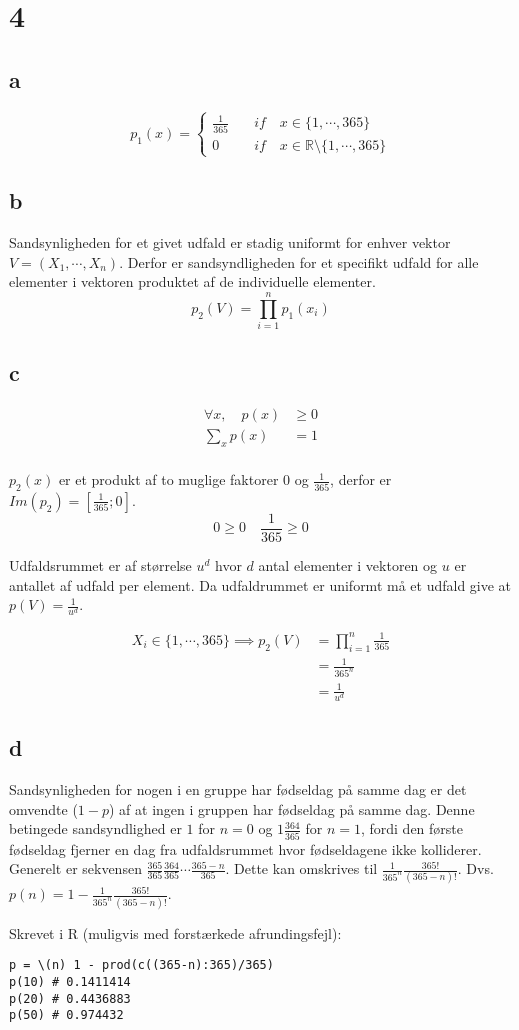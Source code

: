 \documentclass[11pt]{article}
\begin{document}
\section{4}
\label{sec:org962979d}
\subsection{a}
\label{sec:orgd035d0f}
\begin{equation}
p_1(x) =
\begin{cases}
\frac{1}{365} & \quad if \quad x \in \{1,\cdots,365\}\\
0 & \quad if \quad x \in \mathbb{R} \setminus \{1,\cdots,365\}
\end{cases}
\end{equation}
\subsection{b}
\label{sec:org9002a13}
Sandsynligheden for et givet udfald er stadig uniformt for enhver vektor \(V = (X_1,\cdots,X_n)\).
Derfor er sandsyndligheden for et specifikt udfald for alle elementer i vektoren produktet af de individuelle elementer.
\[
p_2(V) = \prod_{i=1}^n p_1(x_i)
\]
\subsection{c}
\label{sec:org89602e0}
\begin{align}
\forall x, \quad p(x) &\ge 0 \\
\sum_x p(x) &= 1 \\
\end{align}

\(p_2(x)\) er et produkt af to muglige faktorer \(0\) og \(\frac{1}{365}\),
derfor er \(Im(p_2) = [\frac{1}{365};0]\).
\[0 \ge 0 \quad \frac{1}{365} \ge 0\]

Udfaldsrummet er af størrelse \(u^d\) hvor \(d\) antal elementer i vektoren og \(u\) er antallet af udfald per element.
Da udfaldrummet er uniformt må et udfald give at \(p(V) = \frac{1}{u^d}\).

\begin{align}
X_i \in \{1,\cdots,365\} \implies p_2(V) &= \prod_{i=1}^n \frac{1}{365} \\
&= \frac{1}{365^n} \\
&= \frac{1}{u^d}
\end{align}
\subsection{d}
\label{sec:orgee39b1c}
Sandsynligheden for nogen i en gruppe har fødseldag på samme dag er det omvendte (\(1-p\)) af at ingen i gruppen har fødseldag på samme dag.
Denne betingede sandsyndlighed er \(1\) for \(n=0\) og \(1\frac{364}{365}\) for \(n=1\),
fordi den første fødseldag fjerner en dag fra udfaldsrummet hvor fødseldagene ikke kolliderer.
Generelt er sekvensen \(\frac{365}{365}\frac{364}{365}\cdots\frac{365-n}{365}\).
Dette kan omskrives til \(\frac{1}{365^n}\frac{365!}{(365-n)!}\).
Dvs. \(p(n) = 1- \frac{1}{365^n}\frac{365!}{(365-n)!}\).

Skrevet i R (muligvis med forstærkede afrundingsfejl):
\begin{verbatim}
p = \(n) 1 - prod(c((365-n):365)/365)
p(10) # 0.1411414
p(20) # 0.4436883
p(50) # 0.974432
\end{verbatim}
\end{document}
